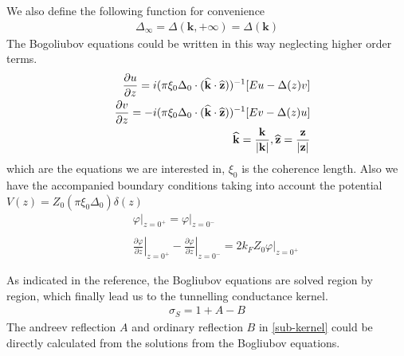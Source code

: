 We also define the following function for convenience
\begin{eqnarray}\label{delta infty}
\Delta_{\infty}=\Delta(\mathbf{k},+\infty)=\Delta(\mathbf{k})
\end{eqnarray}
The Bogoliubov equations could be written in this way neglecting higher order terms\citep{Reference4}.
\begin{eqnarray}\label{eq:BdG}
&&\DF{\partial u}{\partial z}=i(\pi \xi_0\Delta_0\cdot(\widehat{\mathbf{k}}\cdot\widehat{\mathbf{z}}))^{-1}[Eu-\Delta(z)v]\nonumber\\
&&\DF{\partial v}{\partial z}=-i(\pi \xi_0\Delta_0\cdot(\widehat{\mathbf{k}}\cdot\widehat{\mathbf{z}}))^{-1}[Ev-\Delta(z)u]\nonumber\\
&&\widehat{\mathbf{k}}=\frac{\mathbf{k}}{|\mathbf{k}|},\widehat{\mathbf{z}}=\frac{\mathbf{z}}{|\mathbf{z}|}
\end{eqnarray}
which are the equations we are interested in, $\xi_0$ is the coherence length. Also we have the accompanied boundary conditions taking into account the potential $V(z)=Z_0(\pi\xi_0\Delta_0)\delta(z)$
\begin{eqnarray}\label{eq:OridinaryBoundary}
&&\left.\varphi\right|_{z=0^+}=\left.\varphi\right|_{z=0^-}\nonumber\\
\\
&&\left.\frac{\partial \varphi}{\partial z}\right|_{z=0^+}-\left.\frac{\partial \varphi}{\partial z}\right|_{z=0^-}=\left.2k_FZ_0\varphi\right|_{z=0^+}\nonumber
\end{eqnarray}

As indicated in the reference\citep{Reference4}, the Bogliubov equations are solved region by region, which finally lead us to the tunnelling conductance kernel. 
\begin{eqnarray}\label{sub-kernel}
\sigma_S=1+A-B
\end{eqnarray}
The andreev reflection $A$ and ordinary reflection $B$ in \eqref{sub-kernel} could be directly calculated from the solutions from the Bogliubov equations.

